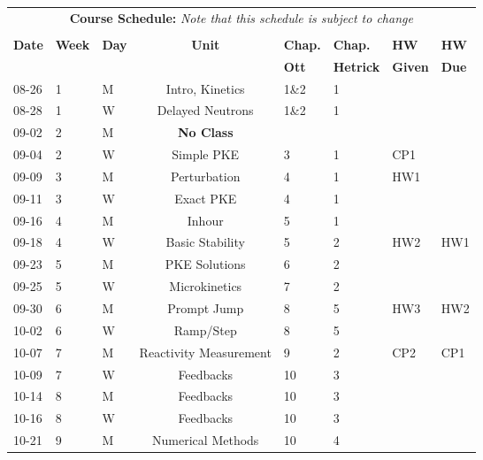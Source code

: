 \documentclass[11pt]{article}
\begin{document}
\pagebreak
\FloatBarrier
\renewcommand{\arraystretch}{1}
\begin{table}[h]
\begin{center}
\begin{tabular}{lllcllll}
\multicolumn{8}{c}{\textbf{Course Schedule:}\textit{ Note that this schedule is subject to change}}\\
&&&&&&&\\
\textbf{Date} & \textbf{Week} & \textbf{Day} & \textbf{Unit} & \textbf{Chap.} & \textbf{Chap.} & \textbf{HW} & \textbf{HW}\\
              &  &  & & \textbf{Ott}& \textbf{Hetrick} & \textbf{Given} & \textbf{Due}\\
\hline
\hline
08-26 & 1 & M  & Intro, Kinetics                & 1\&2   & 1 &      & \\
08-28 & 1 & W & Delayed Neutrons                & 1\&2   & 1 &      & \\
09-02 & 2 & M  & \textbf{No Class}              &    &   &      & \\
09-04 & 2 & W & Simple PKE                      & 3  & 1 & CP1  & \\
09-09 & 3 & M  & Perturbation                   & 4  & 1 & HW1  & \\
09-11 & 3 & W & Exact PKE                       & 4  & 1 &      & \\
09-16 & 4 & M  & Inhour                         & 5  & 1 &      & \\
09-18 & 4 & W &  Basic Stability                & 5  & 2 & HW2  & HW1\\
09-23 & 5 & M  & PKE Solutions                  & 6  & 2 &      & \\
09-25 & 5 & W & Microkinetics                   & 7  & 2 &      & \\
09-30 & 6 & M  & Prompt Jump                    & 8  & 5 & HW3  & HW2\\
10-02 & 6 & W & Ramp/Step                       & 8  & 5 &      & \\
10-07 & 7 & M  & Reactivity Measurement         & 9  & 2 & CP2  & CP1\\
10-09 & 7 & W & Feedbacks                       & 10 & 3 &      & \\
10-14 & 8 & M  & Feedbacks                      & 10 & 3 &      & \\
10-16 & 8 & W & Feedbacks                       & 10 & 3 &      & \\
10-21 & 9 & M  & Numerical Methods              & 10 & 4 &      & \\

\end{tabular}
\end{center}
\end{table}
\end{document}

